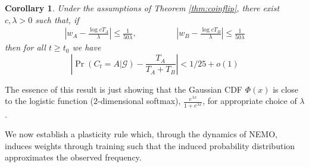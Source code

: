 \documentclass{article}
\newtheorem{corollary}[theorem]{Corollary}
\theoremstyle{remark}
\newcommand{\1}{\mathbbm{1}}
\begin{document}
\begin{corollary} \label{cor:target}
    Under the assumptions of Theorem \ref{thm:coinflip}, there exist $c, \lambda > 0$ such that, if 
    \begin{align*}
        \left|w_A - \frac{\log c T_A}{\lambda}\right| \le \frac{1}{50\lambda}, \hspace{2cm}
        \left|w_B - \frac{\log c T_B}{\lambda}\right| \le \frac{1}{50\lambda}
    \end{align*}
    then for all $t \ge t_0$ we have
    \[\left|\Pr(C_t = A | \mathcal G) - \frac{T_A}{T_A + T_B} \right| < 1/ 25 + o(1)\]
\end{corollary}
The essence of this result is just showing that the Gaussian CDF $\Phi(x)$ is close to the logistic function ($2$-dimensional softmax), $\frac{e^{\lambda x}}{1 + e^{\lambda x}}$, for appropriate choice of $\lambda$.

We now establish a plasticity rule which, through the dynamics of NEMO, induces weights through training such that the induced probability distribution approximates the observed frequency.

\end{document}
